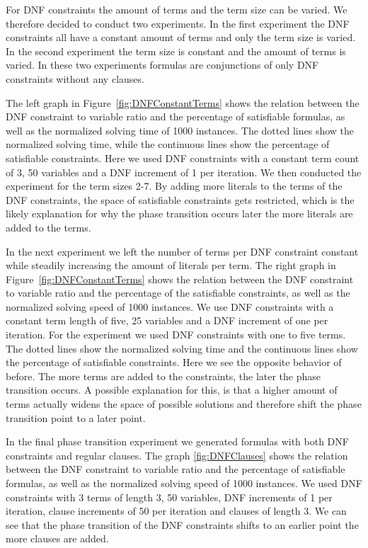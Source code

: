 \documentclass{easychair}
\begin{document}
For DNF constraints the amount of terms and the term size can be varied. We therefore decided to conduct two experiments. In the first experiment the DNF constraints all have a constant amount of terms and only the term size is varied. In the second experiment the term size is constant and the amount of terms is varied. In these two experiments formulas are conjunctions of only DNF constraints without any clauses.



The left graph in Figure~\ref{fig:DNFConstantTerms} shows the relation between the DNF constraint to variable ratio and the percentage of satisfiable formulas, as well as the normalized solving time of 1000 instances. The dotted lines show the normalized solving time, while the continuous lines show the percentage of satisfiable constraints. Here we used DNF constraints with a constant term count of 3, 50 variables and a DNF increment of 1 per iteration. We then conducted the experiment for the term sizes 2-7. By adding more literals to the terms of the DNF constraints, the space of satisfiable constraints gets restricted, which is the likely explanation for why the phase transition occurs later the more literals are added to the terms.

In the next experiment we left the number of terms per DNF constraint constant while steadily increasing the amount of literals per term.
The right graph in Figure~\ref{fig:DNFConstantTerms} shows the relation between the DNF constraint to variable ratio and the percentage of the satisfiable constraints, as well as the normalized solving speed of 1000 instances. We use DNF constraints with a constant term length of five, 25 variables and a DNF increment of one per iteration. For the experiment we used DNF constraints with one to five terms. The dotted lines show the normalized solving time and the continuous lines show the percentage of satisfiable constraints. Here we see the opposite behavior of before. The more terms are added to the constraints, the later the phase transition occurs. A possible explanation for this, is that a higher amount of terms actually widens the space of possible solutions and therefore shift the phase transition point to a later point. 

	
In the final phase transition experiment we generated formulas with both DNF constraints and regular clauses.
The graph \ref{fig:DNFClauses} shows the relation between the DNF constraint to variable ratio and the percentage of satisfiable formulas, as well as the normalized solving speed of 1000 instances. We used DNF constraints with 3 terms of length 3, 50 variables, DNF increments of 1 per iteration, clause increments of 50 per iteration and clauses of length 3. We can see that the phase transition of the DNF constraints shifts to an earlier point the more clauses are added. 
\end{document}
